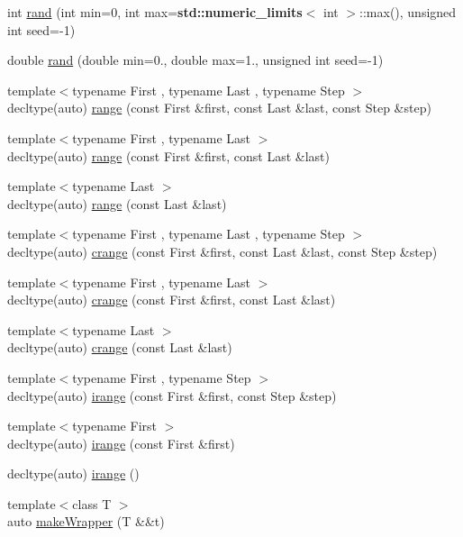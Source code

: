 \begin{DoxyCompactItemize}
int \hyperlink{group__RandomGroup_gafd96a435a958e1e7f9a7354d77fda735}{rand} (int min=0, int max={\bf std\+::numeric\+\_\+limits}$<$ int $>$\+::max(), unsigned int seed=-\/1)
\item 
double \hyperlink{group__RandomGroup_ga8d9c1e9192ab9c278e91c3afaf28d069}{rand} (double min=0., double max=1., unsigned int seed=-\/1)
\item 
{\footnotesize template$<$typename First , typename Last , typename Step $>$ }\\decltype(auto) \hyperlink{namespacehandy_aefc805a0d2f653bd767202a6e2eb189d}{range} (const First \&first, const Last \&last, const Step \&step)
\item 
{\footnotesize template$<$typename First , typename Last $>$ }\\decltype(auto) \hyperlink{namespacehandy_af378d0c8411cee1d5045ccde47393db7}{range} (const First \&first, const Last \&last)
\item 
{\footnotesize template$<$typename Last $>$ }\\decltype(auto) \hyperlink{namespacehandy_ad3ed0e5c4cfa2cfbb84b079af021842d}{range} (const Last \&last)
\item 
{\footnotesize template$<$typename First , typename Last , typename Step $>$ }\\decltype(auto) \hyperlink{namespacehandy_aa0041d089e4da567b9de69529ef86f00}{crange} (const First \&first, const Last \&last, const Step \&step)
\item 
{\footnotesize template$<$typename First , typename Last $>$ }\\decltype(auto) \hyperlink{namespacehandy_a875b248b245a28a928c832cac6bcf1ce}{crange} (const First \&first, const Last \&last)
\item 
{\footnotesize template$<$typename Last $>$ }\\decltype(auto) \hyperlink{namespacehandy_a1dcfdd94bbbc4afac6c4ee7f34345043}{crange} (const Last \&last)
\item 
{\footnotesize template$<$typename First , typename Step $>$ }\\decltype(auto) \hyperlink{namespacehandy_adb17848d08336798ddc61fdbd13ffcf4}{irange} (const First \&first, const Step \&step)
\item 
{\footnotesize template$<$typename First $>$ }\\decltype(auto) \hyperlink{namespacehandy_ad795cd86d0fbd7afd19816a02cbb6a4a}{irange} (const First \&first)
\item 
decltype(auto) \hyperlink{namespacehandy_a200e7146e18ba3ea618aa1da0b26a700}{irange} ()
\item 
{\footnotesize template$<$class T $>$ }\\auto \hyperlink{namespacehandy_a0238cc3395a74ef060d33e7208a5c025}{make\+Wrapper} (T \&\&t)
\end{DoxyCompactItemize}
